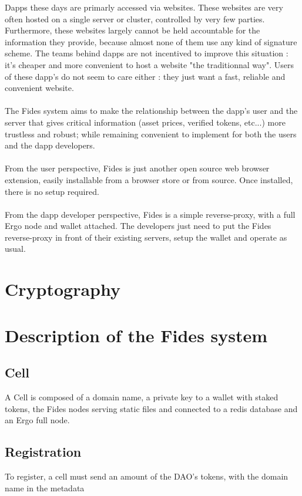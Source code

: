 \documentclass{paper}
\begin{document}
Dapps these days are primarly accessed via websites. These websites are very often hosted on a single server or cluster, controlled by very few parties. Furthermore, these websites largely cannot be held accountable for the information they provide, because almost none of them use any kind of signature scheme. The teams behind dapps are not incentived to improve this situation : it's cheaper and more convenient to host a website "the traditionnal way". Users of these dapp's do not seem to care either : they just want a fast, reliable and convenient website. 
\\\\
The Fides system aims to make the relationship between the dapp's user and the server that gives critical information (asset prices, verified tokens, etc...) more trustless and robust; while remaining convenient to implement for both the users and the dapp developers.
\\\\
From the user perspective, Fides is just another open source web browser extension, easily installable from a browser store or from source. Once installed, there is no setup required.
\\\\
From the dapp developer perspective, Fides is a simple reverse-proxy, with a full Ergo node and wallet attached. The developers just need to put the Fides reverse-proxy in front of their existing servers, setup the wallet and operate as usual.

\section{Cryptography}

\section{Description of the Fides system}

\subsection{Cell}

A Cell is composed of a domain name, a private key to a wallet with staked tokens, the Fides nodes serving static files and connected to a redis database and an Ergo full node.

\subsection{Registration}
To register, a cell must send an amount of the DAO's tokens, with the domain name in the metadata
\end{document}
